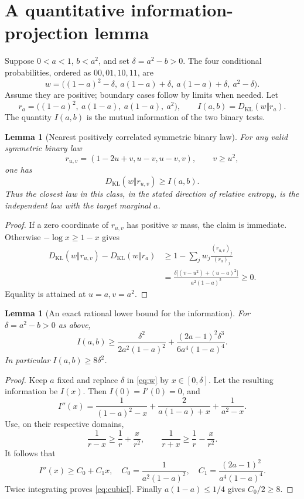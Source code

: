 \documentclass[11pt,a4paper]{article}
\newtheorem{lemma}[theorem]{Lemma}
\newcommand{\KL}{D_{\mathrm{KL}}}
\begin{document}
\section{A quantitative information-projection lemma}
Suppose $0<a<1$, $b<a^2$, and set $\delta=a^2-b>0$. The four conditional probabilities, ordered as $00,01,10,11$, are
\begin{equation}\label{eq:w}
 w=\big((1-a)^2-\delta,\ a(1-a)+\delta,\ a(1-a)+\delta,\ a^2-\delta\big).
\end{equation}
Assume they are positive; boundary cases follow by limits when needed. Let
\[
 r_a=\big((1-a)^2,\ a(1-a),\ a(1-a),\ a^2\big),
 \qquad I(a,b)=\KL(w\Vert r_a).
\]
The quantity $I(a,b)$ is the mutual information of the two binary tests.

\begin{lemma}[Nearest positively correlated symmetric binary law]\label{lem:projection}
For any valid symmetric binary law
\[
 r_{u,v}=(1-2u+v,u-v,u-v,v),\qquad v\geq u^2,
\]
one has
\begin{equation}\label{eq:projection}
 \KL(w\Vert r_{u,v})\geq I(a,b).
\end{equation}
Thus the closest law in this class, in the stated direction of relative entropy, is the independent law with the target marginal $a$.
\end{lemma}
\begin{proof}
If a zero coordinate of $r_{u,v}$ has positive $w$ mass, the claim is immediate. Otherwise $-\log x\geq1-x$ gives
\begin{align*}
 \KL(w\Vert r_{u,v})-\KL(w\Vert r_a)
 &\geq1-\sum_j w_j\frac{(r_{u,v})_j}{(r_a)_j}\\
 &=\frac{\delta\big[(v-u^2)+(u-a)^2\big]}{a^2(1-a)^2}\geq0.
\end{align*}
Equality is attained at $u=a,v=a^2$.
\end{proof}

\begin{lemma}[An exact rational lower bound for the information]\label{lem:cubic}
For $\delta=a^2-b>0$ as above,
\begin{equation}\label{eq:cubicI}
 I(a,b)\geq
 \frac{\delta^2}{2a^2(1-a)^2}
 +\frac{(2a-1)^2\delta^3}{6a^4(1-a)^4}.
\end{equation}
In particular $I(a,b)\geq8\delta^2$.
\end{lemma}
\begin{proof}
Keep $a$ fixed and replace $\delta$ in \eqref{eq:w} by $x\in[0,\delta]$. Let the resulting information be $I(x)$. Then $I(0)=I'(0)=0$, and
\[
 I''(x)=\frac1{(1-a)^2-x}+\frac2{a(1-a)+x}+\frac1{a^2-x}.
\]
Use, on their respective domains,
\[
 \frac1{r-x}\geq\frac1r+\frac{x}{r^2},
 \qquad \frac1{r+x}\geq\frac1r-\frac{x}{r^2}.
\]
It follows that
\[
 I''(x)\geq C_0+C_1x,\quad
 C_0=\frac1{a^2(1-a)^2},\quad
 C_1=\frac{(2a-1)^2}{a^4(1-a)^4}.
\]
Twice integrating proves \eqref{eq:cubicI}. Finally $a(1-a)\leq1/4$ gives $C_0/2\geq8$.
\end{proof}
\end{document}
